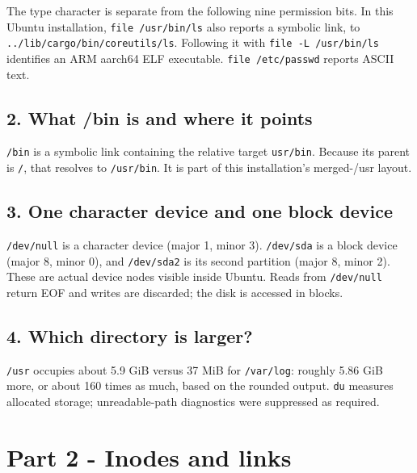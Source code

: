 The type character is separate from the following nine permission bits. In this Ubuntu installation, \texttt{file /\allowbreak{}usr/\allowbreak{}bin/\allowbreak{}ls} also reports a symbolic link, to \texttt{../\allowbreak{}lib/\allowbreak{}cargo/\allowbreak{}bin/\allowbreak{}coreutils/\allowbreak{}ls}. Following it with \texttt{file -L /\allowbreak{}usr/\allowbreak{}bin/\allowbreak{}ls} identifies an ARM aarch64 ELF executable. \texttt{file /\allowbreak{}etc/\allowbreak{}passwd} reports ASCII text.

\subsection{2. What /bin is and where it points}

\texttt{/\allowbreak{}bin} is a symbolic link containing the relative target \texttt{usr/\allowbreak{}bin}. Because its parent is \texttt{/\allowbreak{}}, that resolves to \texttt{/\allowbreak{}usr/\allowbreak{}bin}. It is part of this installation's merged-/usr layout.

\subsection{3. One character device and one block device}

\texttt{/\allowbreak{}dev/\allowbreak{}null} is a character device (major 1, minor 3). \texttt{/\allowbreak{}dev/\allowbreak{}sda} is a block device (major 8, minor 0), and \texttt{/\allowbreak{}dev/\allowbreak{}sda2} is its second partition (major 8, minor 2). These are actual device nodes visible inside Ubuntu. Reads from \texttt{/\allowbreak{}dev/\allowbreak{}null} return EOF and writes are discarded; the disk is accessed in blocks.

\subsection{4. Which directory is larger?}

\texttt{/\allowbreak{}usr} occupies about 5.9 GiB versus 37 MiB for \texttt{/\allowbreak{}var/\allowbreak{}log}: roughly 5.86 GiB more, or about 160 times as much, based on the rounded output. \texttt{du} measures allocated storage; unreadable-path diagnostics were suppressed as required.

\section{Part 2 - Inodes and links}


